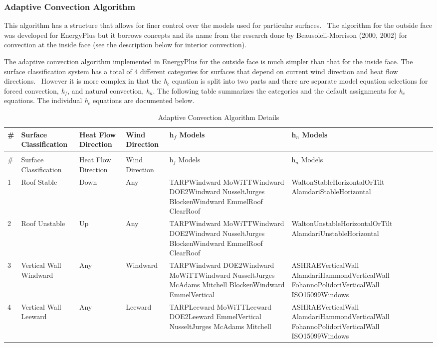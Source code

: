 \subsubsection{Adaptive Convection Algorithm}\label{adaptive-convection-algorithm-000}

This algorithm has a structure that allows for finer control over the models used for particular surfaces.~ The algorithm for the outside face was developed for EnergyPlus but it borrows concepts and its name from the research done by Beausoleil-Morrison (2000, 2002) for convection at the inside face (see the description below for interior convection).

The adaptive convection algorithm implemented in EnergyPlus for the outside face is much simpler than that for the inside face. The surface classification system has a total of 4 different categories for surfaces that depend on current wind direction and heat flow directions.~ However it is more complex in that the \emph{h\(_{c}\)} equation is split into two parts and there are separate model equation selections for forced convection, \emph{h\(_{f}\)}, and natural convection, \emph{h\(_{n}\)}. The following table summarizes the categories and the default assignments for \emph{h\(_{c}\)} equations. The individual \emph{h\(_{c}\)} equations are documented below.

{\scriptsize
\begin{longtable}[c]{p{0.25in}p{0.75in}p{0.5in}p{0.5in}p{1.75in}p{1.75in}}

\caption{Adaptive Convection Algorithm Details \label{table:adaptive-convection-algorithm-details}} \tabularnewline
\toprule
\# & Surface Classification & Heat Flow Direction & Wind Direction & h\(_f\) Models & h\(_n\) Models \tabularnewline
\midrule
\endfirsthead

\caption[]{Adaptive Convection Algorithm Details} \tabularnewline
\toprule
\# & Surface Classification & Heat Flow Direction & Wind Direction & h\(_f\) Models & h\(_n\) Models \tabularnewline
\midrule
\endhead

1 & Roof Stable & Down & Any & TARPWindward MoWiTTWindward DOE2Windward NusseltJurges BlockenWindward EmmelRoof ClearRoof & WaltonStableHorizontalOrTilt AlamdariStableHorizontal \tabularnewline
2 & Roof Unstable & Up & Any & TARPWindward MoWiTTWindward DOE2Windward NusseltJurges BlockenWindward EmmelRoof ClearRoof & WaltonUnstableHorizontalOrTilt AlamdariUnstableHorizontal \tabularnewline
3 & Vertical Wall Windward & Any & Windward & TARPWindward DOE2Windward MoWiTTWindward NusseltJurges McAdams Mitchell BlockenWindward EmmelVertical & ASHRAEVerticalWall AlamdariHammondVerticalWall FohannoPolidoriVerticalWall ISO15099Windows \tabularnewline
4 & Vertical Wall Leeward & Any & Leeward & TARPLeeward MoWiTTLeeward DOE2Leeward EmmelVertical NusseltJurges McAdams Mitchell & ASHRAEVerticalWall AlamdariHammondVerticalWall FohannoPolidoriVerticalWall ISO15099Windows \tabularnewline
\bottomrule
\end{longtable}}

